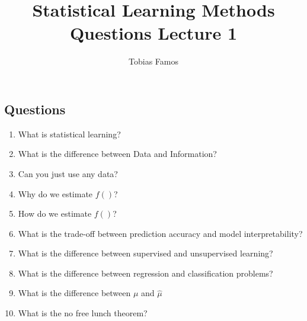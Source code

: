 \documentclass[11pt]{article}
\title{Statistical Learning Methods \\ Questions Lecture 1}
\author{Tobias Famos}
\begin{document}
    \maketitle
\subsection*{Questions}
\begin{enumerate}
    \item What is statistical learning?
    \item What is the difference between Data and Information?
    \item Can you just use any data?
    \item Why do we estimate $f()$?
    \item How do we estimate $f()$?
    \item What is the trade-off between prediction accuracy and model interpretability?
    \item What is the difference between supervised and unsupervised learning?
    \item What is the difference between regression and classification problems?
    \item What is the difference between $\mu$ and $\hat{\mu}$
    \item What is the no free lunch theorem?
\end{enumerate}
    \newpage
\end{document}
